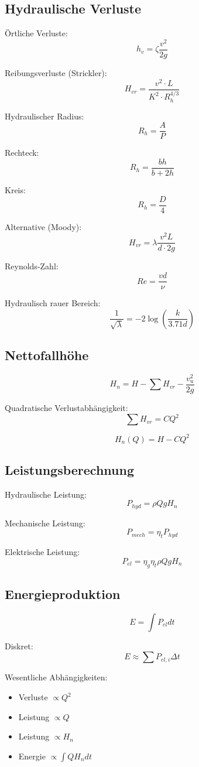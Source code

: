 \subsection{Hydraulische Verluste}

Örtliche Verluste:
\[
h_v = \zeta \frac{v^2}{2g}
\]

Reibungsverluste (Strickler):
\[
H_{vr} =
\frac{v^2 \cdot L}
{K^2 \cdot R_h^{4/3}}
\]

Hydraulischer Radius:
\[
R_h = \frac{A}{P}
\]

Rechteck:
\[
R_h = \frac{b h}{b + 2h}
\]

Kreis:
\[
R_h = \frac{D}{4}
\]

Alternative (Moody):
\[
H_{vr} =
\lambda \frac{v^2 L}{d \cdot 2g}
\]

Reynolds-Zahl:
\[
Re = \frac{v d}{\nu}
\]

Hydraulisch rauer Bereich:
\[
\frac{1}{\sqrt{\lambda}} =
-2 \log \left( \frac{k}{3.71 d} \right)
\]

\subsection{Nettofallhöhe}

\[
H_n = H - \sum H_{vr} - \frac{v_u^2}{2g}
\]

Quadratische Verlustabhängigkeit:
\[
\sum H_{vr} = C Q^2
\]

\[
H_n(Q) = H - C Q^2
\]

\subsection{Leistungsberechnung}

Hydraulische Leistung:
\[
P_{hyd} = \rho Q g H_n
\]

Mechanische Leistung:
\[
P_{mech} = \eta_t P_{hyd}
\]

Elektrische Leistung:
\[
P_{el} = \eta_g \eta_t \rho Q g H_n
\]

\subsection{Energieproduktion}

\[
E = \int P_{el} dt
\]

Diskret:
\[
E \approx \sum P_{el,i} \Delta t
\]

Wesentliche Abhängigkeiten:
\begin{itemize}
\item Verluste $\propto Q^2$
\item Leistung $\propto Q$
\item Leistung $\propto H_n$
\item Energie $\propto \int Q H_n dt$
\end{itemize}




